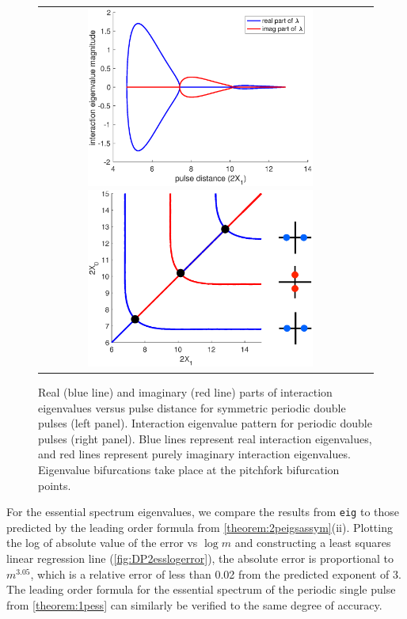 \documentclass[10pt,reqno]{amsart}
\theoremstyle{plain}
\theoremstyle{definition}
\theoremstyle{remark}
\numberwithin{theorem}{section}
\numberwithin{equation}{section}
\begin{document}
\begin{figure}
\begin{center}
\begin{tabular}{cc}
\includegraphics[width=7.5cm]{images/periodicequaleigbif.eps}
\includegraphics[width=7.5cm]{images/2periodiceigpattern.eps}
\end{tabular}
\end{center}
\caption{Real (blue line) and imaginary (red line) parts of interaction eigenvalues versus pulse distance for symmetric periodic double pulses (left panel). Interaction eigenvalue pattern for periodic double pulses (right panel). Blue lines represent real interaction eigenvalues, and red lines represent purely imaginary interaction eigenvalues. Eigenvalue bifurcations take place at the pitchfork bifurcation points. }
\label{fig:periodiceigbif}
\end{figure}
For the essential spectrum eigenvalues, we compare the results from \texttt{eig} to those predicted by the leading order formula from \cref{theorem:2peigsassym}(ii). Plotting the log of absolute value of the error vs $\log m$ and constructing a least squares linear regression line (\cref{fig:DP2esslogerror}), the absolute error is proportional to $m^{3.05}$, which is a relative error of less than 0.02 from the predicted exponent of $3$. The leading order formula for the essential spectrum of the periodic single pulse from \cref{theorem:1pess} can similarly be verified to the same degree of accuracy.
\end{document}
